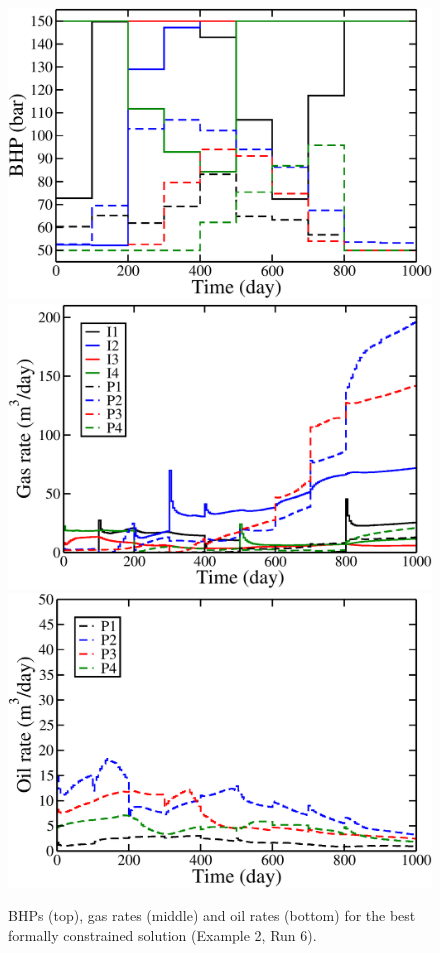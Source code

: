\documentclass[twocolumn,numbook]{svjour3}          %
\begin{document}
\begin{figure}
\begin{center}
\includegraphics[totalheight=2.2in,angle=0]{spe10TopLayerConstrainedOptimalIuPa_BHP.pdf}
\includegraphics[totalheight=2.2in,angle=0]{spe10TopLayerConstrainedOptimalIuPa_rate_gas.pdf}
\includegraphics[totalheight=2.2in,angle=0]{spe10TopLayerConstrainedOptimalIuPa_rate_oil.pdf}
\end{center}
\caption{BHPs (top), gas rates (middle) and oil rates
  (bottom) for the best formally constrained solution (Example 2, Run 6).}
\label{fig:SPE10TopLayerConstrainedOptimalRates}
\end{figure}
\end{document}
